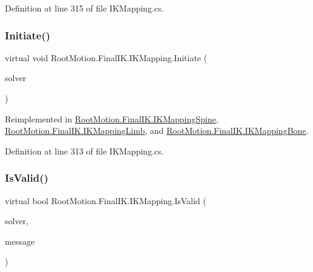Definition at line 315 of file I\+K\+Mapping.\+cs.

\mbox{\label{class_root_motion_1_1_final_i_k_1_1_i_k_mapping_a530ab0e13f90bde214eba3a23ed24d73}} 
\subsubsection{\texorpdfstring{Initiate()}{Initiate()}}
{\footnotesize\ttfamily virtual void Root\+Motion.\+Final\+I\+K.\+I\+K\+Mapping.\+Initiate (\begin{DoxyParamCaption}\item[{\mbox{\hyperlink{class_root_motion_1_1_final_i_k_1_1_i_k_solver_full_body}{I\+K\+Solver\+Full\+Body}}}]{solver }\end{DoxyParamCaption})\hspace{0.3cm}{\ttfamily [virtual]}}



Reimplemented in \mbox{\hyperlink{class_root_motion_1_1_final_i_k_1_1_i_k_mapping_spine_a1b6610a202659f34e6126e943fa3fb1d}{Root\+Motion.\+Final\+I\+K.\+I\+K\+Mapping\+Spine}}, \mbox{\hyperlink{class_root_motion_1_1_final_i_k_1_1_i_k_mapping_limb_abae95dfedf3c3b0742e0f368f0c02666}{Root\+Motion.\+Final\+I\+K.\+I\+K\+Mapping\+Limb}}, and \mbox{\hyperlink{class_root_motion_1_1_final_i_k_1_1_i_k_mapping_bone_a7eea7aefe2699d7b01ebafe17543c6bd}{Root\+Motion.\+Final\+I\+K.\+I\+K\+Mapping\+Bone}}.



Definition at line 313 of file I\+K\+Mapping.\+cs.

\mbox{\label{class_root_motion_1_1_final_i_k_1_1_i_k_mapping_a4a81f9083afd318e2578de48fa914870}} 
\subsubsection{\texorpdfstring{Is\+Valid()}{IsValid()}}
{\footnotesize\ttfamily virtual bool Root\+Motion.\+Final\+I\+K.\+I\+K\+Mapping.\+Is\+Valid (\begin{DoxyParamCaption}\item[{\mbox{\hyperlink{class_root_motion_1_1_final_i_k_1_1_i_k_solver}{I\+K\+Solver}}}]{solver,  }\item[{ref string}]{message }\end{DoxyParamCaption})\hspace{0.3cm}{\ttfamily [virtual]}}



